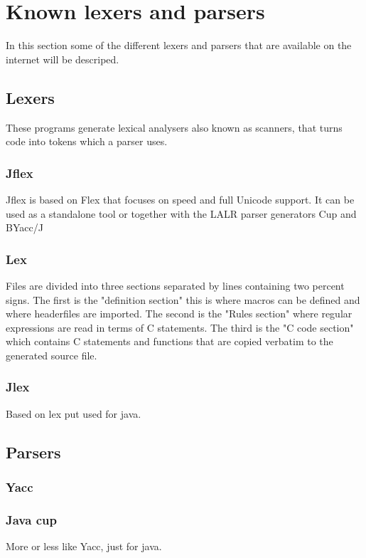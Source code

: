 \section{Known lexers and parsers}
In this section some of the different lexers and parsers that are available on the internet will be descriped.

\subsection{Lexers}
These programs generate lexical analysers also known as scanners, that turns code into tokens which a parser uses.

\subsubsection{Jflex}
Jflex is based on Flex that focuses on speed and full Unicode support. It can be used as a standalone tool or together with  the LALR parser generators Cup and BYacc/J

\subsubsection{Lex}
Files are divided into three sections separated by lines containing two percent signs. The first is the "definition section" this is where macros can be defined and where headerfiles are imported. The second is the "Rules section" where regular expressions are read in terms of C statements. The third is the "C code section" which contains C statements and functions that are copied verbatim to the generated source file.

\subsubsection{Jlex}
Based on lex put used for java.

\subsection{Parsers}


\subsubsection{Yacc}


\subsubsection{Java cup}
More or less like Yacc, just for java.

